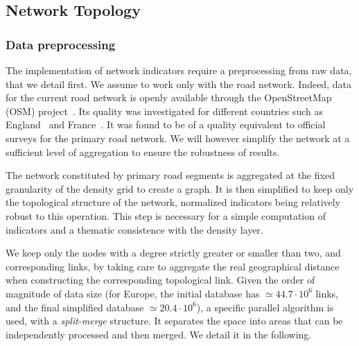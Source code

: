 \subsection{Network Topology}

\subsubsection{Data preprocessing}

The implementation of network indicators require a preprocessing from raw data, that we detail first. We assume to work only with the road network. Indeed, data for the current road network is openly available through the OpenStreetMap (OSM) project~\citep{openstreetmap}. Its quality was investigated for different countries such as England~\cite{haklay2010good} and France~\cite{girres2010quality}. It was found to be of a quality equivalent to official surveys for the primary road network. We will however simplify the network at a sufficient level of aggregation to ensure the robustness of results.


The network constituted by primary road segments is aggregated at the fixed granularity of the density grid to create a graph. It is then simplified to keep only the topological structure of the network, normalized indicators being relatively robust to this operation. This step is necessary for a simple computation of indicators and a thematic consistence with the density layer.



We keep only the nodes with a degree strictly greater or smaller than two, and corresponding links, by taking care to aggregate the real geographical distance when constructing the corresponding topological link. Given the order of magnitude of data size (for Europe, the initial database has $\simeq 44.7\cdot 10^6$ links, and the final simplified database $\simeq 20.4\cdot 10^6$), a specific parallel algorithm is used, with a \emph{split-merge} structure. It separates the space into areas that can be independently processed and then merged. We detail it in the following.


